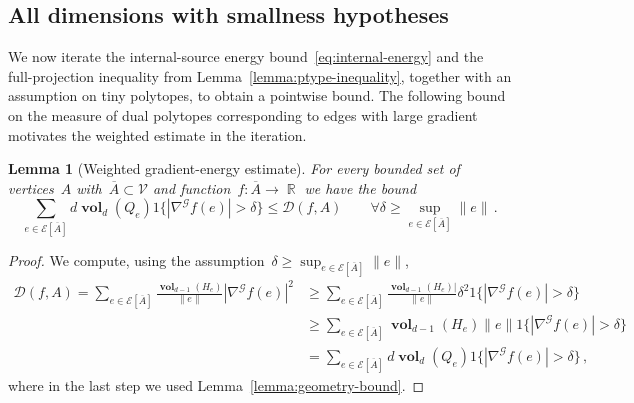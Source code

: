 \documentclass[12pt]{amsart}
\numberwithin{equation}{section}
\DeclareMathOperator{\R}{\mathbb{R}}
\newtheorem{lemma}[theorem]{Lemma}
\newcommand{\V}{\mathcal{V}}
\newcommand{\E}{\mathcal{E}}
\newcommand{\D}{\hyperref[eq:dir.energy]{\mathcal{D}}}
\newcommand{\Qe}{\hyperref[eq:qeset]{Q_e}}
\DeclareMathOperator{\vol}{\mathbf{vol}}
\begin{document}
\subsection{All dimensions with smallness hypotheses}
We now iterate the internal-source energy bound~\eqref{eq:internal-energy} and the full-projection inequality from Lemma~\ref{lemma:ptype-inequality}, together with an assumption on tiny polytopes, to obtain a pointwise bound. The following bound on the measure of dual polytopes corresponding to edges with large gradient motivates the weighted estimate in the iteration.


\begin{lemma}[Weighted gradient-energy estimate]
	\label{lemma:gradient-energy-estimate}
	For every bounded set of vertices~$A$ with~$\overline A \subset \V$ and function~$f: \overline{A} \to \R$  we have
	the bound
	\[
	 \sum_{e \in \E[\overline{A}]} d \vol_{d}(\Qe)  1\{ |\nabla^{\mathcal{G}} f(e)| > \delta\}  \leq \D(f, A) 	 \qquad \forall \delta \geq \sup_{e \in \E[\overline{A}]} \|e\| \, . 
	\]
\end{lemma}
\begin{proof}
	We compute, using the assumption~$\delta \geq \sup_{e \in \E[\overline{A}]} \|e\|$, 
	\begin{align*}
		\D(f, A)  =  \sum_{e \in \E[\overline{A}]} \frac{\vol_{d-1}(H_e)}{\|e\|} |\nabla^{\mathcal{G}} f(e)|^2  
		&\geq \sum_{e \in \E[\overline{A}]} \frac{\vol_{d-1}(H_e)|}{\|e\|} \delta^2 1\{ |\nabla^{\mathcal{G}} f(e)| > \delta\} \\
		&\geq \sum_{e \in \E[\overline{A}]} \vol_{d-1}(H_e) \|e\|   1\{ |\nabla^{\mathcal{G}} f(e)| > \delta\}  \\
		&= \sum_{e \in \E[\overline{A}]} d \vol_{d}(\Qe)  1\{ |\nabla^{\mathcal{G}} f(e)| > \delta\}  \, , 
	\end{align*}
	where in the last step we used Lemma~\ref{lemma:geometry-bound}. 
\end{proof}
\end{document}
